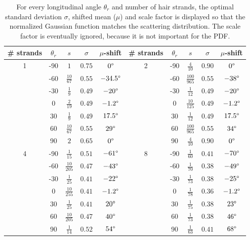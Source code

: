 \documentclass[11pt,a4paper]{report}
\begin{document}
\begin{table}[h]
\begin{center}
\begin{tabular}{|cc|c|c|c||cc|c|c|c|}
\hline
\# strands & $\theta_r$ & $s$ & $\sigma$ & $\mu$-shift  & \# strands & $\theta_r$ & $s$ & $\sigma$ & $\mu$-shift\\ \hline \hline
1 & -90 & $1$ & $0.75$ & $0 \degree$					& 2 & -90 & $\frac{4}{10}$ & $0.90$ & $0\degree$ \\
  & -60 & $\frac{10}{67}$ & $0.55$ & $-34.5 \degree$ 	&  & -60 & $\frac{100}{965}$ & $0.55$ & $-38\degree$ \\
  & -30 & $\frac{1}{9}$ & $0.49$ & $-20 \degree$ 		&  & -30 & $\frac{1}{12}$ & $0.49$ & $-20\degree$ \\
 & 0 & $\frac{2}{19}$ & $0.49$ & $-1.2\degree$ 			&  & 0 & $\frac{10}{125}$ & $0.49$ & $-1.2\degree$ \\
 & 30 & $\frac{1}{9}$ & $0.49$ & $17.5 \degree$ 			&  & 30 & $\frac{1}{12}$ & $0.49$ & $17.5\degree$ \\

   & 60 & $\frac{10}{67}$ & $0.55$ & $29 \degree$ 		&  & 60 & $\frac{100}{965}$ & $0.55$ & $34\degree$ \\

  & 90 & $2$ & $0.65$ & $0 \degree$ 					&  & 90 & $\frac{4}{10}$ & $0.90$ & $0\degree$ \\ \hline
4  & -90 & $\frac{1}{15}$ & $0.51$ & $-61 \degree$					& 8 & -90 & $\frac{1}{60}$ & $0.41$ & $-70\degree$ \\
  & -60 & $\frac{10}{205}$ & $0.47$ & $-43 \degree$ 	&  & -60 & $\frac{1}{70}$ & $0.38$ & $-49\degree$ \\
  & -30 & $\frac{1}{25}$ & $0.41$ & $-22 \degree$ 		&  & -30 & $\frac{1}{73}$ & $0.38$ & $-25\degree$ \\
 & 0 & $\frac{10}{255}$ & $0.41$ & $-1.2\degree$ 			& & 0 & $\frac{1}{78}$ & $0.36$ & $-1.2\degree$ \\
 & 30 & $\frac{1}{25}$ & $0.41$ & $20 \degree$ 			&  & 30 & $\frac{1}{75}$ & $0.38$ & $23\degree$ \\
 & 60 & $\frac{10}{205}$ & $0.47$ & $40 \degree$ 		&  & 60 & $\frac{1}{73}$ & $0.38$ & $46\degree$ \\
 & 90 & $\frac{1}{14}$ & $0.52$ & $54 \degree$ 					&  & 90 & $\frac{1}{63}$ & $0.41$ & $68\degree$ \\ \hline
\end{tabular}
\caption{For every longitudinal angle $\theta_r$ and number of hair strands, the optimal standard deviation $\sigma$, shifted mean ($\mu$) and scale factor is displayed so that the normalized Gaussian function matches the scattering distribution. The scale factor is eventually ignored, because it is not important for the PDF.}
\label{optimal_values}
\end{center}
\end{table}
\end{document}
